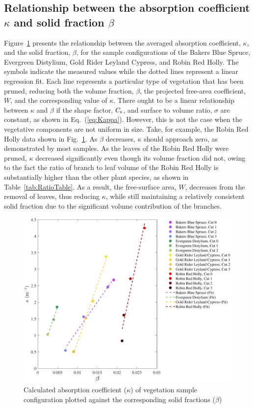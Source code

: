\documentclass[12pt]{article}
\begin{document}
\subsection{Relationship between the absorption coefficient $\kappa$ and solid fraction $\beta$ }

Figure~\ref{fig:betavkappa} presents the relationship between the averaged absorption coefficient, $\kappa$, and the solid fraction, $\beta$, for the sample configurations of the Bakers Blue Spruce, Evergreen Distylium, Gold Rider Leyland Cypress, and Robin Red Holly. The symbols indicate the measured values while the dotted lines represent a linear regression fit. Each line represents a particular type of vegetation that has been pruned, reducing both the volume fraction, $\beta$, the projected free-area coefficient, $W$, and the corresponding value of $\kappa$. There ought to be a linear relationship between $\kappa$ and $\beta$ if the shape factor, $C_{\rm s}$, and surface to volume ratio, $\sigma$ are constant, as shown in Eq.~(\ref{eq:Kappa}). However, this is not the case when the vegetative components are not uniform in size. Take, for example, the Robin Red Holly data shown in Fig.~\ref{fig:betavkappa}. As $\beta$ decreases, $\kappa$ should approach zero, as demonstrated by most samples. As the leaves of the Robin Red Holly were pruned, $\kappa$ decreased significantly even though its volume fraction did not, owing to the fact the ratio of branch to leaf volume of the Robin Red Holly is substantially higher than the other plant species, as shown in Table~\ref{tab:RatioTable}.  As a result, the free-surface area, $W$, decreases from the removal of leaves, thus reducing $\kappa$, while still maintaining a relatively consistent solid fraction due to the significant volume contribution of the branches.

\begin{figure}[!h]
	\centering
    \includegraphics[width=1\linewidth]{Picture12.pdf}
	\caption[Comparison of absorption coefficient, $\kappa$, and solid fraction, $\beta$]{Calculated absorption coefficient ($\kappa$) of vegetation sample configuration plotted against the corresponding solid fractions ($\beta$)}
	\label{fig:betavkappa}
\end{figure}
\end{document}

